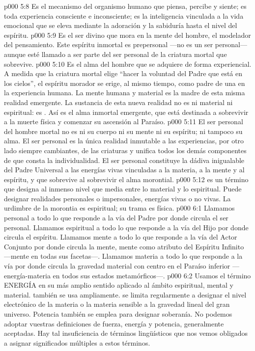 \vs p000 5:8  Es el mecanismo del organismo humano que piensa, percibe y siente; es toda experiencia consciente e inconsciente; es la inteligencia vinculada a la vida emocional que se eleva mediante la adoración y la sabiduría hasta el nivel del espíritu.
\vs p000 5:9  Es el ser divino que mora en la mente del hombre, el modelador del pensamiento. Este espíritu inmortal es prepersonal ---no es un ser personal--- aunque esté llamado a ser parte del ser personal de la criatura mortal que sobrevive.
\vs p000 5:10  Es el alma del hombre que se adquiere de forma experiencial. A medida que la criatura mortal elige “hacer la voluntad del Padre que está en los cielos”, el espíritu morador se erige, al mismo tiempo, como padre de una  en la experiencia humana. La mente humana y material es la madre de esta misma realidad emergente. La sustancia de esta nueva realidad no es ni material ni espiritual: es . Así es el alma inmortal emergente, que está destinada a sobrevivir a la muerte física y comenzar su ascensión al Paraíso.
\vs p000 5:11 \pc {} El ser personal del hombre mortal no es ni su cuerpo ni su mente ni su espíritu; ni tampoco su alma. El ser personal es la única realidad inmutable a las experiencias, por otro lado siempre cambiantes, de las criaturas y unifica todos los demás componentes de que consta la individualidad. El ser personal constituye la dádiva inigualable del Padre Universal a las energías vivas vinculadas a la materia, a la mente y al espíritu, y que sobrevive al sobrevivir el alma morontial.
\vs p000 5:12 \pc {} es un término que designa al inmenso nivel que media entre lo material y lo espiritual. Puede designar realidades personales o impersonales, energías vivas o no vivas. La urdimbre de la morontia es espiritual; su trama es física.
\vs p000 6:1 Llamamos personal a todo lo que responde a la vía del Padre por donde circula el ser personal. Llamamos espiritual a todo lo que responde a la vía del Hijo por donde circula el espíritu. Llamamos mente a todo lo que responde a la vía del Actor Conjunto por donde circula la mente, mente como atributo del Espíritu Infinito ---mente en todas sus facetas---. Llamamos materia a todo lo que responde a la vía por donde circula la gravedad material con centro en el Paraíso inferior ---energía\hyp{}materia en todos sus estados metamórficos---.
\vs p000 6:2 \pc Usamos el término ENERGÍA en su más amplio sentido aplicado al ámbito espiritual, mental y material.  también se usa ampliamente.  se limita regularmente a designar el nivel electrónico de la materia o la materia sensible a la gravedad lineal del gran universo. Potencia también se emplea para designar soberanía. No podemos adoptar vuestras definiciones de fuerza, energía y potencia, generalmente aceptadas. Hay tal insuficiencia de términos lingüísticos que nos vemos obligados a asignar significados múltiples a estos términos.
